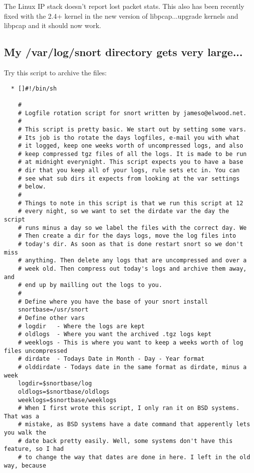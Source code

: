 \documentclass{article}
\begin{document}
The Linux IP stack doesn't report lost packet stats. This also has been
recently fixed with the 2.4+ kernel in the new version of libpcap...upgrade
kernels and libpcap and it should now work.

\subsection{My /var/log/snort directory gets very large...}

Try this script to archive the files:

\begin{verbatim}
  * []#!/bin/sh

    # 
    # Logfile rotation script for snort written by jameso@elwood.net.
    # 
    # This script is pretty basic. We start out by setting some vars.
    # Its job is tho rotate the days logfiles, e-mail you with what 
    # it logged, keep one weeks worth of uncompressed logs, and also
    # keep compressed tgz files of all the logs. It is made to be run
    # at midnight everynight. This script expects you to have a base
    # dir that you keep all of your logs, rule sets etc in. You can 
    # see what sub dirs it expects from looking at the var settings
    # below.
    # 
    # Things to note in this script is that we run this script at 12 
    # every night, so we want to set the dirdate var the day the script
    # runs minus a day so we label the files with the correct day. We
    # Then create a dir for the days logs, move the log files into 
    # today's dir. As soon as that is done restart snort so we don't miss
    # anything. Then delete any logs that are uncompressed and over a
    # week old. Then compress out today's logs and archive them away, and
    # end up by mailling out the logs to you.
    #
    # Define where you have the base of your snort install
    snortbase=/usr/snort
    # Define other vars
    # logdir   - Where the logs are kept
    # oldlogs  - Where you want the archived .tgz logs kept
    # weeklogs - This is where you want to keep a weeks worth of log files uncompressed
    # dirdate  - Todays Date in Month - Day - Year format
    # olddirdate - Todays date in the same format as dirdate, minus a week
    logdir=$snortbase/log
    oldlogs=$snortbase/oldlogs
    weeklogs=$snortbase/weeklogs
    # When I first wrote this script, I only ran it on BSD systems. That was a
    # mistake, as BSD systems have a date command that apperently lets you walk the
    # date back pretty easily. Well, some systems don't have this feature, so I had
    # to change the way that dates are done in here. I left in the old way, because

\end{verbatim}
\end{document}
